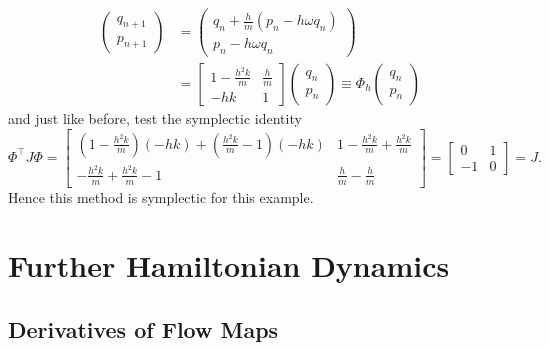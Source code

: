\begin{equation*}
	\begin{aligned}
		\begin{pmatrix}
			q_{n+1} \\
			p_{n+1} 
		\end{pmatrix} &= \begin{pmatrix}
			q_{n} + \frac{h}{m} \left( p_{n} - h \omega q_n \right) \\
			p_{n} - h \omega q_n
		\end{pmatrix} \\
		&= \begin{bmatrix}
			1 - \frac{h^2 k}{m} & \frac{h}{m} \\
			-hk & 1
		\end{bmatrix} \begin{pmatrix}
			q_n \\
			p_n
		\end{pmatrix} \equiv \Phi_h \begin{pmatrix}
			q_n \\
			p_n
		\end{pmatrix}
	\end{aligned}
\end{equation*}
and just like before, test the symplectic identity
\begin{equation*}
	\Phi^\top{J}\Phi = \begin{bmatrix}
		\left(1-\frac{h^2 k}{m}\right)(-hk) + \left(\frac{h^2 k}{m}-1\right)(-hk) & 1 - \frac{h^2 k}{m} + \frac{h^2 k}{m} \\
		-\frac{h^2 k}{m} + \frac{h^2 k}{m} -1 & \frac{h}{m} - \frac{h}{m}
	\end{bmatrix} = \begin{bmatrix}
		0 & 1 \\
		-1 & 0
	\end{bmatrix} = {J}.
\end{equation*}
Hence this method is symplectic for this example.

\section{Further Hamiltonian Dynamics}

\subsection{Derivatives of Flow Maps}

